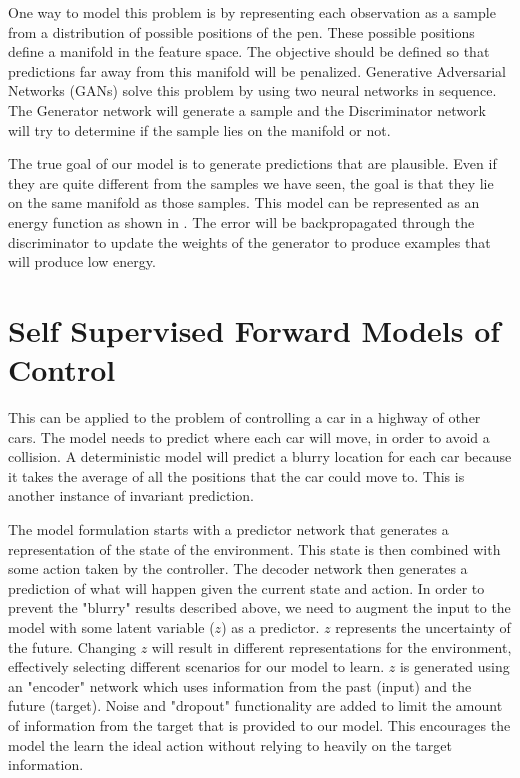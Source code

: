 One way to model this problem is by representing each observation as a sample from a  distribution of possible positions of the pen. These possible positions define a manifold in the feature space. The objective should be defined so that predictions far away from this manifold will be penalized. Generative Adversarial Networks (GANs) solve this problem by using two neural networks in sequence. The Generator network will generate a sample and the Discriminator network will try to determine if the sample lies on the manifold or not. 

The true goal of our model is to generate predictions that are plausible. Even if they are quite different from the samples we have seen, the goal is that they lie on the same manifold as those samples. This model can be represented as an energy function as shown in \cite{zhao2016energy}. The error will be backpropagated through the discriminator to update the weights of the generator to produce examples that will produce low energy.

\section{Self Supervised Forward Models of Control}

This can be applied to the problem of controlling a car in a highway of other cars. The model needs to predict where each car will move, in order to avoid a collision. A deterministic model will predict a blurry location for each car because it takes the average of all the positions that the car could move to. This is another instance of invariant prediction.

The model formulation starts with a predictor network that generates a representation of the state of the environment. This state is then combined with some action taken by the controller. The decoder network then generates a prediction of what will happen given the current state and action. In order to prevent the "blurry" results described above, we need to augment the input to the model with some latent variable ($z$) as a predictor. $z$ represents the uncertainty of the future. Changing $z$ will result in different representations for the environment, effectively selecting different scenarios for our model to learn. $z$ is generated using an "encoder" network which uses information from the past (input) and the future (target). Noise and "dropout" functionality are added to limit the amount of information from the target that is provided to our model. This encourages the model the learn the ideal action without relying to heavily on the target information.

